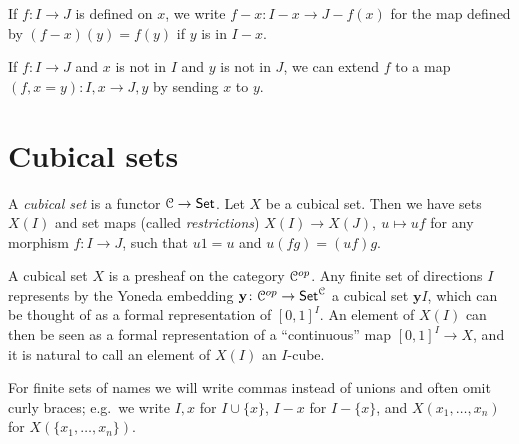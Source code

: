 \documentclass[a4paper,USenglish,draft]{lipics}
\newcommand{\CC}{{\mathcal C}}
\newcommand{\yoneda}{\mathbf{y}}
\newcommand{\set}[1]{\{#1\}}
\begin{document}
If $f:I\to J$ is defined on $x$, we write $f-x:I-x \to J-{f(x)}$ for
the map defined by $(f-x)(y) = f(y)$ if $y$ is in $I-x.$

If $f:I\to J$ and $x$ is not in $I$ and $y$ is not in $J$, we can
extend $f$ to a map $(f,x=y):I,x\to J,y$ by sending $x$ to $y$.

\section{Cubical sets}

A \emph{cubical set} is a functor $\CC\to{\sf Set}$.  Let $X$ be a
cubical set. Then we have sets $X(I)$ and set maps (called
\emph{restrictions}) $X(I)\to X(J),~u\longmapsto uf$ for any morphism
$f:I\to J$, such that $u1 = u$ and $u(fg) = (uf)g$.

\medskip

A cubical set $X$ is a presheaf on the category ${\cal C}^{op}$. Any
finite set of directions $I$ represents by the Yoneda embedding
$\yoneda \colon {\cal C}^{op} \to {\sf Set}^{\cal C}$ a cubical set
$\yoneda I$, which can be thought of as a formal representation of
$[0,1]^I$.  An element of $X(I)$ can then be seen as a formal
representation of a ``continuous'' map $[0,1]^I\to X$, and it is
natural to call an element of $X(I)$ an $I$-cube.

For finite sets of names we will write commas instead of unions and
often omit curly braces; e.g.\ we write $I,x$ for $I \cup \set{x}$, $I
- x$ for $I - \set{x}$, and $X (x_1,\dots,x_n)$ for
$X(\set{x_1,\dots,x_n})$.
\end{document}
